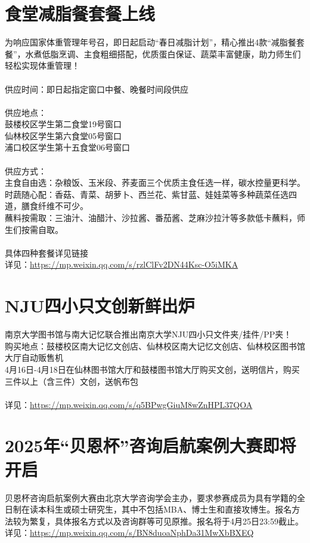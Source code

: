 \documentclass[letterpaper, 12pt]{article}
\begin{document}
\begin{multicols}{2}
\section{食堂减脂餐套餐上线}
为响应国家体重管理年号召，即日起启动“春日减脂计划”，精心推出4款“减脂餐套餐”，水煮低脂烹调、主食粗细搭配，优质蛋白保证、蔬菜丰富健康，助力师生们轻松实现体重管理！
\\
\\供应时间：即日起指定窗口中餐、晚餐时间段供应
\\
\\供应地点：
\\鼓楼校区学生第二食堂19号窗口
\\仙林校区学生第六食堂05号窗口
\\浦口校区学生第十五食堂06号窗口
\\
\\供应方式：
\\主食自由选：杂粮饭、玉米段、荞麦面三个优质主食任选一样，碳水控量更科学。
\\时蔬随心配：香菇、青菜、胡萝卜、西兰花、紫甘蓝、娃娃菜等多种蔬菜任选四道，膳食纤维不可少。
\\蘸料按需取：三油汁、油醋汁、沙拉酱、番茄酱、芝麻沙拉汁等多款低卡蘸料，师生们按需自取。
\\
\\具体四种套餐详见链接
\\详见：\url{https://mp.weixin.qq.com/s/rzlClFv2DN44Ksc-O5iMKA}


\section{NJU四小只文创新鲜出炉}
南京大学图书馆与南大记忆联合推出南京大学NJU四小只文件夹/挂件/PP夹！
\\购买地点：鼓楼校区南大记忆文创店、仙林校区南大记忆文创店、仙林校区图书馆大厅自动贩售机
\\4月16日-4月18日在仙林图书馆大厅和鼓楼图书馆大厅购买文创，送明信片，购买三件以上（含三件）文创，送帆布包
\\
\\详见：\url{https://mp.weixin.qq.com/s/q5BPwgGiuM8wZnHPL37QOA}



\section{2025年“贝恩杯”咨询启航案例大赛即将开启}
贝恩杯咨询启航案例大赛由北京大学咨询学会主办，要求参赛成员为具有学籍的全日制在读本科生或硕士研究生，其中不包括MBA、博士生和直接攻博生。报名方法较为繁复，具体报名方式以及咨询群等可见原推。报名将于4月25日23:59截止。
\\详见：\url{https://mp.weixin.qq.com/s/BN8duoaNphDa31MwXbBXEQ}







\end{multicols}
\end{document}
